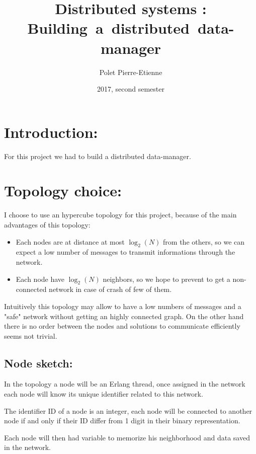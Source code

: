 \documentclass[10pt,a4paper]{article}
\title{Distributed systems : Building~a~distributed~data-manager}
\author{Polet Pierre-Etienne}
\date{2017, second semester}
\begin{document}
	\maketitle
	
	\section*{Introduction:}
		For this project we had to build a distributed data-manager.
		
	\section{Topology choice:}
		I choose to use an hypercube topology for this project, because of the main advantages of this topology:
		\begin{itemize}
			\item Each nodes are at distance at most $\log_2(N)$ from the others, so we can expect a low number of messages to transmit informations through the network.
			\item Each node have $\log_2(N)$ neighbors, so we hope to prevent to get a non-connected network in case of crash of few of them.
		\end{itemize}
		
		Intuitively this topology may allow to have a low numbers of messages and a "safe" network without getting an highly connected graph. On the other hand there is no order between the nodes and solutions to communicate efficiently seems not trivial.
		
		\subsection{Node sketch:}
			In the topology a node will be an Erlang thread, once assigned in the network each node will know its unique identifier related to this network.
			
			The identifier ID of a node is an integer, each node will be connected to another node if and only if their ID differ from 1 digit in their binary representation.
			
			Each node will then had variable to memorize his neighborhood and data saved in the network.
					
\end{document}
